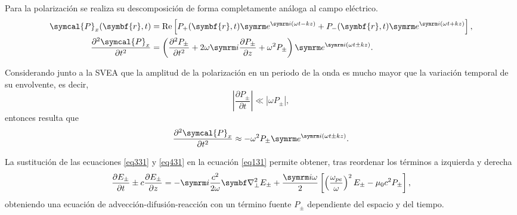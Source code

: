Para la polarización se realiza su descomposición de forma completamente análoga al campo eléctrico.
\begin{align}
    \symcal{P}_x(\symbf{r},t) 
    &=
    \RE\left[P_+(\symbf{r},t)\eu^{\iu(\omega t - kz)}+P_-(\symbf{r},t)\eu^{\iu(\omega t + kz)}\right], \\
    \frac{\partial^2 \symcal{P}_x}{\partial t^2}
    &=
    \left(\frac{\partial^2 P_{\pm}}{\partial t^2} + 2\omega\iu\frac{\partial P_{\pm}}{\partial z} + \omega^2P_{\pm}\right)\eu^{\iu(\omega t \pm kz)}.
\end{align}

Considerando junto a la SVEA que la amplitud de la polarización en un periodo de la onda es mucho mayor que la variación temporal de su envolvente, es decir,
\begin{equation}
    \left|\frac{\partial P_{\pm}}{\partial t}\right| \ll |\omega P_{\pm}|,
\end{equation}
\noindent
entonces resulta que
\begin{equation}
     \frac{\partial^2 \symcal{P}_x}{\partial t^2}
     \approx
     - \omega^2P_{\pm}\eu^{\iu(\omega t \pm kz)}.
     \label{eq431}
\end{equation}

La sustitución de las ecuaciones \eqref{eq331} y \eqref{eq431} en la ecuación \eqref{eq131} permite obtener, tras reordenar los términos a izquierda y derecha
\begin{equation}
    \frac{\partial E_{\pm}}{\partial t} \pm c\frac{\partial E_{\pm}}{\partial z}
    =
    -\iu\frac{c^2}{2\omega}\nab^2_{\perp}E_{\pm} + \frac{\iu\omega}{2}\left[\left(\frac{\omega_{pe}}{\omega}\right)^2E_{\pm} - \mu_0c^2P_{\pm}\right],
\end{equation}
\noindent
obteniendo una ecuación de advección-difusión-reacción con un término fuente $P_{\pm}$ dependiente del espacio y del tiempo. 


